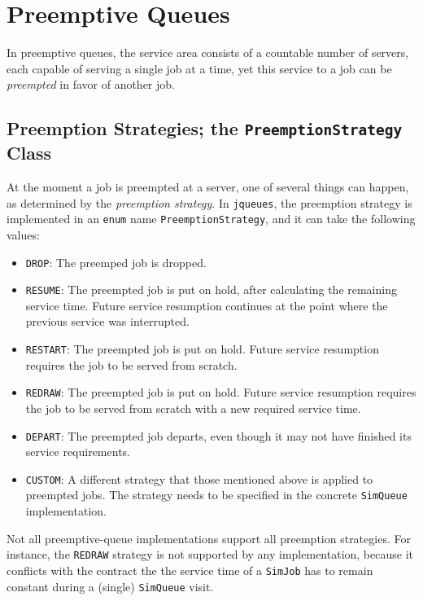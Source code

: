 \documentclass[12pt]{book}
\begin{document}
\section{Preemptive Queues}

In preemptive queues,
  the service area consists of a countable number of servers,
  each capable of serving a single job at a time,
  yet this service to a job can be {\em preempted\/} in favor of another job.

\subsection{Preemption Strategies; the \lstinline{PreemptionStrategy} Class}

At the moment a job is preempted at a server, one of several things can happen,
  as determined by the {\em preemption strategy}.
In \lstinline|jqueues|, the preemption strategy is implemented in an \lstinline|enum|
  name \lstinline|PreemptionStrategy|, and it can take the following values:
\begin{itemize}
  \item \lstinline|DROP|: The preemped job is dropped.
  \item \lstinline|RESUME|: The preempted job is put on hold, after calculating the remaining service time.
                            Future service resumption continues at the point where the previous service was interrupted.
  \item \lstinline|RESTART|: The preempted job is put on hold.
                             Future service resumption requires the job to be served from scratch.
  \item \lstinline|REDRAW|: The preempted job is put on hold.
                            Future service resumption requires the job to be served from scratch
                            with a new required service time.
  \item \lstinline|DEPART|: The preempted job departs, even though it may not have finished its service requirements.
  \item \lstinline|CUSTOM|: A different strategy that those mentioned above is applied to preempted jobs.
                            The strategy needs to be specified in the concrete \lstinline|SimQueue| implementation.
\end{itemize}
Not all preemptive-queue implementations support all preemption strategies.
For instance, the \lstinline|REDRAW| strategy is not supported by any implementation,
  because it conflicts with the contract the the service time of a \lstinline|SimJob| has
  to remain constant during a (single) \lstinline|SimQueue| visit.
\end{document}
